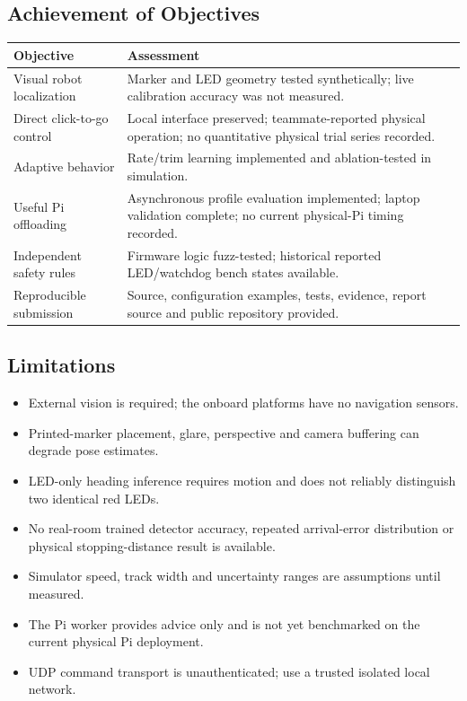 \documentclass[11pt,a4paper]{article}
\begin{document}
\subsection{Achievement of Objectives}
\begin{tabularx}{\textwidth}{@{}YY@{}}\toprule
Objective & Assessment\\\midrule
Visual robot localization & Marker and LED geometry tested synthetically; live calibration accuracy was not measured.\\
Direct click-to-go control & Local interface preserved; teammate-reported physical operation; no quantitative physical trial series recorded.\\
Adaptive behavior & Rate/trim learning implemented and ablation-tested in simulation.\\
Useful Pi offloading & Asynchronous profile evaluation implemented; laptop validation complete; no current physical-Pi timing recorded.\\
Independent safety rules & Firmware logic fuzz-tested; historical reported LED/watchdog bench states available.\\
Reproducible submission & Source, configuration examples, tests, evidence, report source and public repository provided.\\\bottomrule
\end{tabularx}

\subsection{Limitations}
\begin{itemize}
\item External vision is required; the onboard platforms have no navigation sensors.
\item Printed-marker placement, glare, perspective and camera buffering can degrade pose estimates.
\item LED-only heading inference requires motion and does not reliably distinguish two identical red LEDs.
\item No real-room trained detector accuracy, repeated arrival-error distribution or physical stopping-distance result is available.
\item Simulator speed, track width and uncertainty ranges are assumptions until measured.
\item The Pi worker provides advice only and is not yet benchmarked on the current physical Pi deployment.
\item UDP command transport is unauthenticated; use a trusted isolated local network.
\end{itemize}
\end{document}
